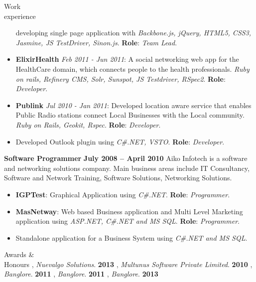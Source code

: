 \documentclass{resume}
\begin{document}
\begin{category}{Work \\experience}
\begin{itemize}
    developing single page application with {\em Backbone.js, jQuery,
      HTML5, CSS3, Jasmine, JS TestDriver, Sinon.js}. \textbf{Role}: {\em Team Lead}.
  \item \textbf{ElixirHealth} {\em Feb 2011 - Jun 2011}: A social networking web app for the HealthCare
    domain, which connects people to the health professionals. {\em
      Ruby on rails, Refinery CMS, Solr, Sunspot, JS Testdriver,
      RSpec2}. \textbf{Role}: {\em Developer}.
  \item \textbf{Publink} {\em Jul 2010 - Jan 2011}: Developed location aware service that enables Public Radio
    stations connect Local Businesses with the Local community. {\em Ruby on Rails, Geokit, Rspec}. \textbf{Role}: {\em Developer}.
  \item Developed Outlook plugin using {\em C\#.NET, VSTO}. \textbf{Role}: {\em Developer}.
  \end{itemize}
  \citemnobullet \textbf{Software Programmer} \hfill \textbf{July 2008 -- April 2010}
  \citemnobullet Aiko Infotech is a software and networking solutions
  company. Main business areas include IT Consultancy, Software and Network
  Training, Software Solutions, Networking Solutions.
  \begin{itemize} 
  \item \textbf{IGPTest}: Graphical Application using {\em C\#.NET}. \textbf{Role}: {\em Programmer}.
  \item \textbf{MasNetway}: Web based Business application and Multi Level Marketing
    application using {\em ASP.NET, C\#.NET and MS SQL}. \textbf{Role}: {\em Programmer}.
  \item Standalone application for a Business System using {\em C\#.NET and MS SQL}.
  \end{itemize}
\end{category}


\begin{category}{Awards \&\\ Honours}
  , {\em Nuevalgo Solutions}. \hfill \textbf{2013}
  , {\em Multunus Software Private Limited}. \hfill \textbf{2010}
  , {\em Banglore}. \hfill \textbf{2011}
  , {\em Banglore}. \hfill \textbf{2011}
  , {\em Banglore}. \hfill \textbf{2013}
\end{category}
\end{document}
